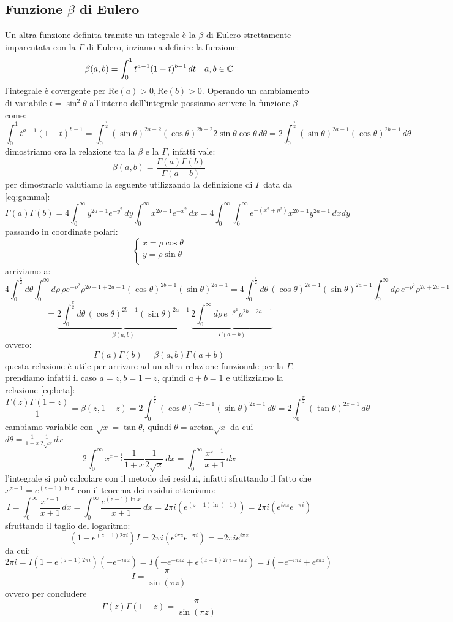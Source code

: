 \subsection{Funzione $\beta$ di Eulero}
Un altra funzione definita tramite un integrale è la $\beta$ di Eulero strettamente imparentata con la $\Gamma$ di Eulero, inziamo a definire la funzione:
\[\beta(a,b) = \int_0^1t^{a-1}(1-t)^{b-1}\, dt \quad a,b\in \mathbb{C}\]
l'integrale è covergente per $\text{Re}(a)>0,\text{Re}(b)>0$. Operando un cambiamento di variabile $t = \sin^2\theta$ all'interno dell'integrale possiamo scrivere la funzione $\beta$
come:
\[ \int_0^1t^{a-1}(1-t)^{b-1} =  \int_0^{\frac{\pi}{2}} (\sin\theta)^{2a-2}(\cos\theta)^{2b-2} 2\sin\theta\cos\theta\,d\theta = 2\int_0^{\frac{\pi}{2}} (\sin\theta)^{2a-1}(\cos\theta)^{2b-1}\,d\theta \]
dimostriamo ora la relazione tra la $\beta$ e la $\Gamma$, infatti vale:
\begin{equation}\label{eq:beta}\beta(a,b) = \frac{\Gamma(a)\Gamma(b)}{\Gamma(a+b)}
\end{equation}
per dimostrarlo valutiamo la seguente utilizzando la definizione di $\Gamma$ data da \eqref{eq:gamma}:
\[\Gamma(a)\Gamma(b) = 4\int_0^\infty y^{2a-1}e^{-y^2}\,dy\int_0^\infty x^{2b-1}e^{-x^2}\,dx = 4\int_0^\infty\int_0^\infty e^{-(x^2+y^2)} x^{2b-1}y^{2a-1}\,dxdy \]
passando in coordinate polari:
\[\begin{cases}
    x =\rho \cos\theta   \\
    y=\rho \sin\theta\\
  \end{cases}\]
 arriviamo a:
 \[4\int_0^{\frac{\pi}{2}}d\theta\int_0^\infty d\rho\,\rho e^{-\rho^2}\rho^{2b-1+2a-1}(\cos\theta)^{2b-1}(\sin\theta)^{2a-1} = 4\int_0^{\frac{\pi}{2}}d\theta\,(\cos\theta)^{2b-1}(\sin\theta)^{2a-1}\int_0^\infty d\rho\,e^{-\rho^2}\rho^{2b+2a-1} \]
 \[= \underbrace{2\int_0^{\frac{\pi}{2}}d\theta\,(\cos\theta)^{2b-1}(\sin\theta)^{2a-1}}_{\beta(a,b)}\,\underbrace{2\int_0^\infty d\rho\,e^{-\rho^2}\rho^{2b+2a-1}}_{\Gamma(a+b)}\]
ovvero:
\[\Gamma(a)\Gamma(b) =\beta(a,b)\Gamma(a+b)\]
questa relazione è utile per arrivare ad un altra relazione funzionale per la $\Gamma$, prendiamo infatti il caso $a=z,b=1-z$, quindi $a+b=1$ e utilizziamo la relazione \eqref{eq:beta}:
\[\frac{\Gamma(z)\Gamma(1-z)}{1} = \beta(z,1-z) = 2\int_0^{\frac{\pi}{2}}(\cos\theta)^{-2z+1}(\sin\theta)^{2z-1}\, d\theta = 2\int_0^{\frac{\pi}{2}}(\tan\theta)^{2z-1}\,d\theta \]
cambiamo variabile con $\sqrt{x} = \tan\theta$, quindi $\theta = \text{arctan}\sqrt{x}$ da cui $d\theta = \frac{1}{1+x}\frac{1}{2\sqrt{x}}dx$
\[2\int_0^\infty x^{z-\frac{1}{2}}\frac{1}{1+x}\frac{1}{2\sqrt{x}}\,dx = \int_0^\infty \frac{x^{z-1}}{x+1}\,dx\]
l'integrale si può calcolare con il metodo dei residui, infatti sfruttando il fatto che $x^{z-1} = e^{(z-1)\ln x}$ con il teorema dei residui otteniamo:
\[I = \int_0^\infty \frac{x^{z-1}}{x+1}\,dx = \int_0^\infty \frac{e^{(z-1)\ln x}}{x+1}\,dx = 2\pi i(e^{(z-1)\ln(-1)}) = 2\pi i (e^{i\pi z} e^{-\pi i})\]
sfruttando il taglio del logaritmo:
\[(1-e^{(z-1)2\pi i}) I = 2\pi i (e^{i\pi z} e^{-\pi i}) = - 2\pi ie^{i\pi z} \]
da cui:
\[2\pi i = I(1-e^{(z-1)2\pi i}) (-e^{-i\pi z }) = I(-e^{-i\pi z }+e^{(z-1)2\pi i-i\pi z}) = I(-e^{-i\pi z }+e^{i\pi z}) \]
\[I = \frac{\pi}{\sin(\pi z)}\]
ovvero per concludere
\[\Gamma(z)\Gamma(1-z) = \frac{\pi}{\sin(\pi z)}\]

